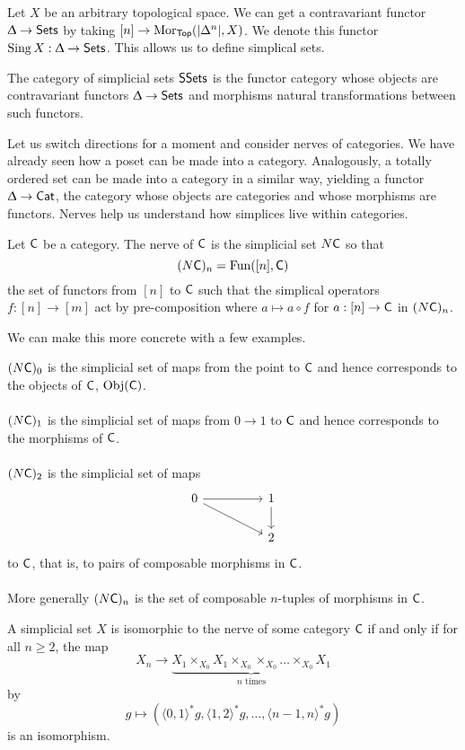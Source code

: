 Let $X$ be an arbitrary topological space. We can get a contravariant functor $\Updelta\to\mathsf{Sets}$ by taking $[n]\to\mathrm{Mor}_{\mathsf{Top}}(|\Delta^{n}|,X)$. We denote this functor $\operatorname{Sing} X:\Updelta\to\mathsf{Sets}$. This allows us to define simplical sets. 
\begin{definition}
  The category of simplicial sets $\mathsf{SSets}$ is the functor category whose objects are contravariant functors $\Updelta\to\mathsf{Sets}$ and morphisms natural transformations between such functors. 
\end{definition}

Let us switch directions for a moment and consider nerves of categories. We have already seen how a poset can be made into a category. Analogously, a totally ordered set can be made into a category in a similar way, yielding a functor $\Updelta\to\mathsf{Cat}$, the category whose objects are categories and whose morphisms are functors. Nerves help us understand how simplices live within categories. 
\begin{definition}[Nerve]
  Let $\mathsf{C}$ be a category. The nerve of $\mathsf{C}$ is the simplicial set $N\mathsf{C}$ so that 
  $$(N\mathsf{C})_{n}=\mathrm{Fun}([n],\mathsf{C})$$
  the set of functors from $[n]$ to $\mathsf{C}$ such that the simplical operators $f:[n]\to[m]$ act by pre-composition where $a\mapsto a\circ f$ for $a:[n]\to\mathsf{C}$ in $(N\mathsf{C})_{n}$. 
\end{definition}
We can make this more concrete with a few examples. 
\begin{example}
  $(N\mathsf{C})_{0}$ is the simplicial set of maps from the point to $\mathsf{C}$ and hence corresponds to the objects of $\mathsf{C}$, $\mathrm{Obj}(\mathsf{C})$. 
  \\\\
  $(N\mathsf{C})_{1}$ is the simplicial set of maps from $0\to 1$ to $\mathsf{C}$ and hence corresponds to the morphisms of $\mathsf{C}$. 
  \\\\
  $(N\mathsf{C})_{2}$ is the simplicial set of maps 
  $$\begin{tikzcd}
    0 && 1 \\
    && 2
    \arrow[from=1-1, to=1-3]
    \arrow[from=1-3, to=2-3]
    \arrow[from=1-1, to=2-3]
  \end{tikzcd}$$
  to $\mathsf{C}$, that is, to pairs of composable morphisms in $\mathsf{C}$. 
  \\\\
  More generally $(N\mathsf{C})_{n}$ is the set of composable $n$-tuples of morphisms in $\mathsf{C}$. 
\end{example}
\begin{theorem}
  A simplicial set $X$ is isomorphic to the nerve of some category $\mathsf{C}$ if and only if for all $n\geq2$, the map 
  $$X_{n}\to \underbrace{X_{1}\times_{X_{0}}X_{1}\times_{X_{0}}\times_{X_{0}}\dots\times_{X_{0}}X_{1}}_{n\text{ times}}$$
  by
  $$g\mapsto (\langle0,1\rangle^{*}g, \langle1,2\rangle^{*}g,\dots,\langle n-1,n\rangle^{*}g)$$
  is an isomorphism. 
\end{theorem}
